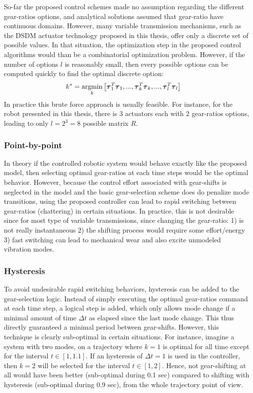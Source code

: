 So-far the proposed control schemes made no assumption regarding the different gear-ratios options, and analytical solutions assumed that gear-ratio have continuous domains. However, many variable transmission mechanisms, such as the DSDM actuator technology proposed in this thesis, offer only a discrete set of possible values. In that situation, the optimization step in the proposed control algorithms would than be a combinatorial optimization problem. However, if the number of options $l$ is reasonably small, then every possible options can be computed quickly to find the optimal discrete option:
%
\begin{align}
k^{*} &= \operatornamewithlimits{argmin}\limits_{k} \left[  \vec{\tau}_1^T\vec{\tau}_1  , ... , \vec{\tau}_k^T\vec{\tau}_k , ...  , \vec{\tau}_l^T\vec{\tau}_l \right]
\end{align}
%
In practice this brute force approach is usually feasible. For instance, for the robot presented in this thesis, there is 3 actuators each with 2 gear-ratios options, leading to only $l=2^3=8$ possible matrix $R$.

\subsubsection{Point-by-point}

In theory if the controlled robotic system would behave exactly like the proposed model, then selecting optimal gear-ratios at each time steps would be the optimal behavior. However, because the control effort associated with gear-shifts is neglected in the model and the basic gear-selection scheme does do penalize mode transitions, using the proposed controller can lead to rapid switching between gear-ratios (chattering) in certain situations. In practice, this is not desirable since for most type of variable transmissions, since changing the gear-ratio: 1) is not really instantaneous 2) the shifting process would require some effort/energy 3) fast switching can lead to mechanical wear and also excite unmodeled vibration modes. 

\subsubsection{Hysteresis}

To avoid undesirable rapid switching behaviors, hysteresis can be added to the gear-selection logic. Instead of simply executing the optimal gear-ratios command at each time step, a logical step is added, which only allows mode change if a minimal amount of time $\Delta t$ as elapsed since the last mode change. This thus directly guaranteed a minimal period between gear-shifts. However, this technique is clearly sub-optimal in certain situations. For instance, imagine a system with two modes, on a trajectory where $k=1$ is optimal for all time except for the interval $t\in[1,1.1]$. If an hysteresis of $\Delta t = 1$ is used in the controller, then $k=2$ will be selected for the interval $t\in[1,2]$. Hence, not gear-shifting at all would have been better (sub-optimal during 0.1 sec) compared to shifting with hysteresis (sub-optimal during 0.9 sec), from the whole trajectory point of view. 

